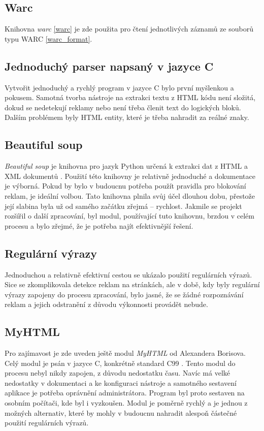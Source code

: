 \subsection{Warc}
Knihovna \textit{warc} \ref{warc} je zde použita pro čtení jednotlivých záznamů ze souborů typu WARC \ref{warc_format}.

\subsection{Jednoduchý parser napsaný v jazyce C}
Vytvořit jednoduchý a rychlý program v jazyce C bylo první myšlenkou a pokusem. Samotná tvorba
nástroje na extrakci textu z HTML kódu není složitá, dokud se nedetekují reklamy nebo není třeba
členit text do logických bloků. Dalším problémem byly HTML entity, které je třeba nahradit za reálné znaky.

\subsection{Beautiful soup}
\textit{Beautiful soup} je knihovna pro jazyk Python určená k extrakci dat z HTML a XML dokumentů \cite{BEATIFULSOUP}.
Použití této knihovny je relativně jednoduché a dokumentace je výborná. Pokud by bylo v budoucnu potřeba použít pravidla pro
blokování reklam, je ideální volbou. Tato knihovna plnila svůj účel dlouhou dobu, přestože její slabina byla už od samého začátku
zřejmá -- rychlost. Jakmile se projekt rozšířil o další zpracování, byl modul, používající tuto knihovnu, brzdou v celém procesu
a bylo zřejmé, že je potřeba najít efektivnější řešení.

\subsection{Regulární výrazy}
Jednoduchou a relativně efektivní cestou se ukázalo použití regulárních výrazů. Sice se zkomplikovala detekce reklam na stránkách,
ale v době, kdy byly regulární výrazy zapojeny do procesu zpracování, bylo jasné, že se žádné rozpoznávání reklam
a jejich odstranění z důvodu výkonnosti provádět nebude.

\subsection{MyHTML}
Pro zajímavost je zde uveden ještě modul \textit{MyHTML} od Alexandera Borisova. Celý modul je psán v jazyce C,
konkrétně standard C99 \cite{MyHTML}. Tento modul do procesu nebyl nikdy zapojen, z důvodu nedostatku času. Navíc má
velké nedostatky v dokumentaci a ke konfiguraci nástroje a samotného sestavení aplikace je
potřeba oprávnění administrátora. Program byl proto sestaven na osobním počítači, kde byl i vyzkoušen. Modul je poměrně rychlý
a je jednou z možných alternativ, které by mohly v budoucnu nahradit alespoň částečné použití regulárních výrazů.

